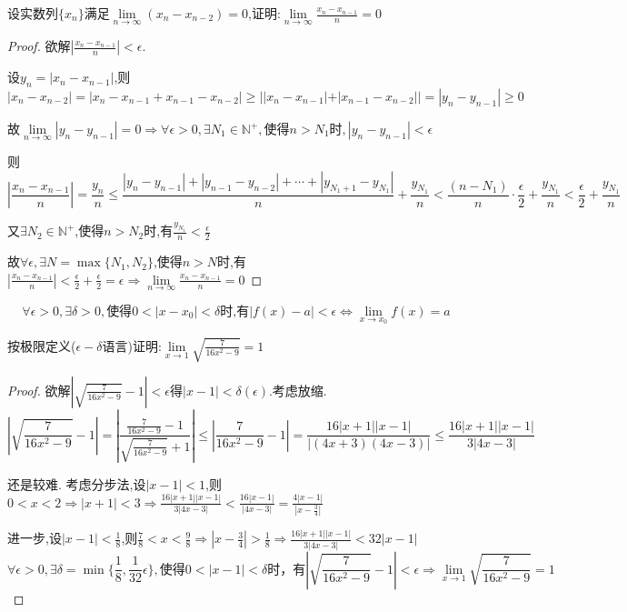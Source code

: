 \begin{example}
    设实数列$\{x_n\}$满足$\lim\limits_{n\to \infty}(x_n-x_{n-2})=0$,证明:$\lim\limits_{n\to \infty}\frac{x_n-x_{n-1}}{n}=0$
\end{example}

\begin{proof}

    欲解$|\frac{x_n-x_{n-1}}{n}|<\epsilon$.

    设$y_n=|x_n-x_{n-1}|$,则$|x_n-x_{n-2}|=|x_n-x_{n-1}+x_{n-1}-x_{n-2}|\ge ||x_n-x_{n-1}|+|x_{n-1}-x_{n-2}||=|y_n-y_{n-1}|\ge 0$

    故$\lim\limits_{n\to \infty}|y_n-y_{n-1}|=0
        \Longrightarrow \forall \epsilon>0,\exists N_1\in \mathbb{N}^+,\mbox{使得}n>N_1\mbox{时},|y_n-y_{n-1}|<\epsilon$

    则$$|\frac{x_n-x_{n-1}}{n}|=\frac{y_n}{n}\le
        \frac{|y_n-y_{n-1}|+|y_{n-1}-y_{n-2}|+\cdots +|y_{N_1+1}-y_{N_1}|}{n}+\frac{y_{N_1}}{n}<\frac{(n-N_1)}{n}\cdot \frac{\epsilon}{2}+\frac{y_{N_1}}{n}<\frac{\epsilon}{2}+\frac{y_{N_1}}{n}$$

    又$\exists N_2\in \mathbb{N}^+$,使得$n>N_2$时,有$\frac{y_{N_1}}{n}<\frac{\epsilon}{2}$

    故$\forall \epsilon,\exists N=\max \{N_1,N_2\}$,使得$n>N$时,有$|\frac{x_n-x_{n-1}}{n}|<\frac{\epsilon}{2}+\frac{\epsilon}{2}=\epsilon\Longrightarrow \lim\limits_{n\to \infty}\frac{x_n-x_{n-1}}{n}=0$
\end{proof}

\begin{definition}
    \begin{equation*}
        \forall \epsilon>0,\exists \delta>0,\mbox{使得}0<|x-x_0|<\delta\mbox{时,有}|f(x)-a|<\epsilon\Longleftrightarrow \lim\limits_{x\to x_0} f(x)=a
    \end{equation*}
\end{definition}

\begin{example}
    按极限定义($\epsilon-\delta$语言)证明:$\lim\limits_{x\to 1}\sqrt{\frac{7}{16x^2-9}}=1$
\end{example}

\begin{proof}
    欲解$|\sqrt{\frac{7}{16x^2-9}}-1|<\epsilon$得$|x-1|<\delta(\epsilon)$.考虑放缩.
    $$|\sqrt{\frac{7}{16x^2-9}}-1|=|\frac{\frac{7}{16x^2-9}-1}{\sqrt{\frac{7}{16x^2-9}}+1}|\le |\frac{7}{16x^2-9}-1|=\frac{16|x+1||x-1|}{|(4x+3)(4x-3)|}\le \frac{16|x+1||x-1|}{3|4x-3|}$$

    还是较难. 考虑分步法,设$|x-1|<1$,则$0<x<2\Longrightarrow |x+1|<3\Longrightarrow \frac{16|x+1||x-1|}{3|4x-3|}<\frac{16|x-1|}{|4x-3|}=\frac{4|x-1|}{|x-\frac{3}{4}|}$

    进一步,设$|x-1|<\frac{1}{8}$,则$\frac{7}{8}<x<\frac{9}{8}\Longrightarrow |x-\frac{3}{4}|>\frac{1}{8}\Longrightarrow \frac{16|x+1||x-1|}{3|4x-3|}<32|x-1|$
    $$\forall \epsilon>0,\exists \delta=\min \{\frac{1}{8},\frac{1}{32}\epsilon\},\mbox{使得}0<|x-1|<\delta\mbox{时，有}|\sqrt{\frac{7}{16x^2-9}}-1|<\epsilon\Longrightarrow \lim\limits_{x\to 1}\sqrt{\frac{7}{16x^2-9}}=1$$
\end{proof}

